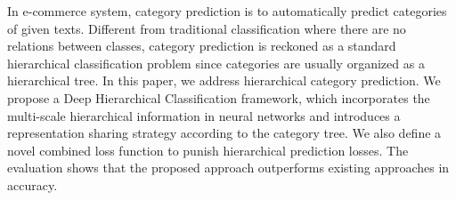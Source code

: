 In e-commerce system, category prediction is to automatically predict categories of given texts. Different from traditional classification where there are no relations between classes, category prediction is reckoned as a standard hierarchical classification problem since categories are usually organized as a hierarchical tree. In this paper, we address hierarchical category prediction. We propose a Deep Hierarchical Classification framework, which incorporates the multi-scale hierarchical information in neural networks and introduces a representation sharing strategy according to the category tree. We also define a novel combined loss function to punish hierarchical prediction losses. The evaluation shows that the proposed approach outperforms existing approaches in accuracy.

